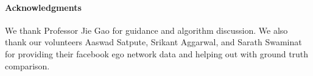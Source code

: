 \paragraph{Acknowledgments}
\label{ack}

%
%
%
%
%

We thank Professor Jie Gao for guidance and algorithm discussion.  We
also thank our volunteers Aaswad Satpute, Srikant Aggarwal, and Sarath
Swaminat for providing their facebook ego network data and helping out
with ground truth comparison.

